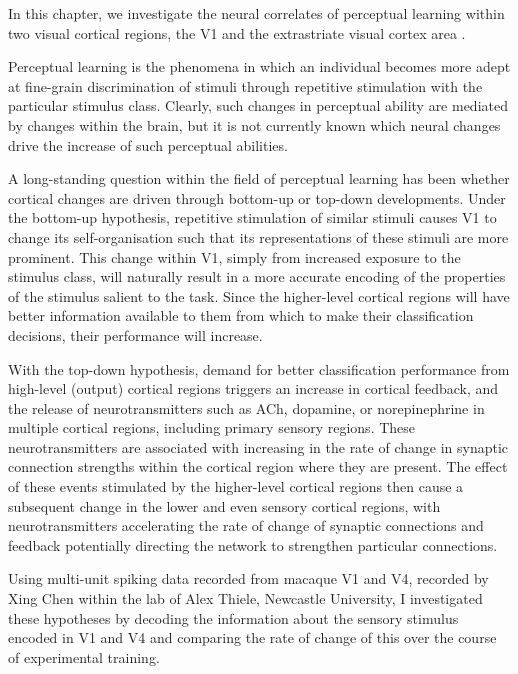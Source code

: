 In this chapter, we investigate the neural correlates of perceptual learning within two visual cortical regions, the \acf{V1} and the extrastriate visual cortex area .

Perceptual learning is the phenomena in which an individual becomes more adept at fine-grain discrimination of stimuli through repetitive stimulation with the particular stimulus class.
Clearly, such changes in perceptual ability are mediated by changes within the brain, but it is not currently known which neural changes drive the increase of such perceptual abilities.

A long-standing question within the field of perceptual learning has been whether cortical changes are driven through bottom-up or top-down developments.
Under the bottom-up hypothesis, repetitive stimulation of similar stimuli causes \ac{V1} to change its self-organisation such that its representations of these stimuli are more prominent.
This change within \ac{V1}, simply from increased exposure to the stimulus class, will naturally result in a more accurate encoding of the properties of the stimulus salient to the task.
Since the higher-level cortical regions will have better information available to them from which to make their classification decisions, their performance will increase.

With the top-down hypothesis, demand for better classification performance from high-level (output) cortical regions triggers an increase in cortical feedback, and the release of neurotransmitters such as \ac{ACh}, dopamine, or norepinephrine in multiple cortical regions, including primary sensory regions.
These neurotransmitters are associated with increasing in the rate of change in synaptic connection strengths within the cortical region where they are present.
The effect of these events stimulated by the higher-level cortical regions then cause a subsequent change in the lower and even sensory cortical regions, with neurotransmitters accelerating the rate of change of synaptic connections and feedback potentially directing the network to strengthen particular connections.

Using multi-unit spiking data recorded from macaque \ac{V1} and \ac{V4}, recorded by Xing Chen within the lab of Alex Thiele, Newcastle University, I investigated these hypotheses by decoding the information about the sensory stimulus encoded in \ac{V1} and \ac{V4} and comparing the rate of change of this over the course of experimental training.
